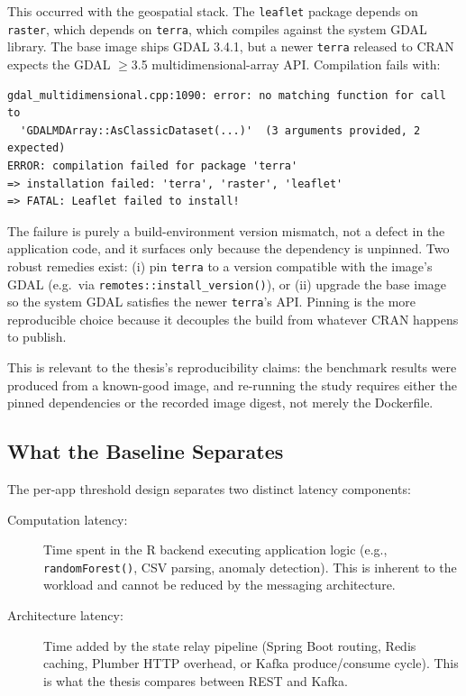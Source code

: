 \documentclass[11pt,a4paper]{article}
\begin{document}
This occurred with the geospatial stack. The \texttt{leaflet} package
depends on \texttt{raster}, which depends on \texttt{terra}, which
compiles against the system GDAL library. The base image ships GDAL
3.4.1, but a newer \texttt{terra} released to CRAN expects the GDAL
$\geq$3.5 multidimensional-array API. Compilation fails with:

\begin{lstlisting}
gdal_multidimensional.cpp:1090: error: no matching function for call to
  'GDALMDArray::AsClassicDataset(...)'  (3 arguments provided, 2 expected)
ERROR: compilation failed for package 'terra'
=> installation failed: 'terra', 'raster', 'leaflet'
=> FATAL: Leaflet failed to install!
\end{lstlisting}

\noindent The failure is purely a build-environment version mismatch, not
a defect in the application code, and it surfaces only because the
dependency is unpinned. Two robust remedies exist: (i) pin
\texttt{terra} to a version compatible with the image's GDAL (e.g.\ via
\texttt{remotes::install\_version()}), or (ii) upgrade the base image so
the system GDAL satisfies the newer \texttt{terra}'s API. Pinning is the
more reproducible choice because it decouples the build from whatever
CRAN happens to publish.

This is relevant to the thesis's reproducibility claims: the benchmark
results were produced from a known-good image, and re-running the study
requires either the pinned dependencies or the recorded image digest,
not merely the Dockerfile.

\subsection{What the Baseline Separates}

The per-app threshold design separates two distinct latency components:

\begin{description}
  \item[Computation latency:] Time spent in the R backend executing
    application logic (e.g., \texttt{randomForest()}, CSV parsing,
    anomaly detection). This is inherent to the workload and cannot
    be reduced by the messaging architecture.

  \item[Architecture latency:] Time added by the state relay pipeline
    (Spring Boot routing, Redis caching, Plumber HTTP overhead, or
    Kafka produce/consume cycle). This is what the thesis compares
    between REST and Kafka.
\end{description}
\end{document}
